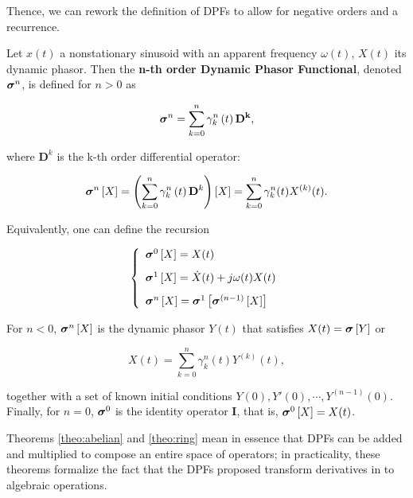 	Thence, we can rework the definition of DPFs to allow for negative orders and a recurrence.

\begin{definition}\label{def:steinmetzoperator_revisited} %
	Let $x(t)$ a nonstationary sinusoid with an apparent frequency $\omega(t)$, $X(t)$ its dynamic phasor. Then the \textbf{n-th order Dynamic Phasor Functional}, denoted $\boldsymbol{\sigma}^{n}$, is defined for $n>0$ as 

\begin{equation} \boldsymbol{\sigma}^{n} = \sum_{k=0}^n \gamma_k^n \left(t\right)\mathbf{D^k} , \end{equation}

	where $\mathbf{D}^k$ is the k-th order differential operator:

\begin{equation} \boldsymbol{\sigma}^{n} \left[X\right] = \left(\sum_{k=0}^n \gamma_k^n \left(t\right)\mathbf{D}^k\right) \left[X\right] = \sum_{k=0}^n \gamma_k^n (t) X^{(k)}(t). \end{equation}

	Equivalently, one can define the recursion

\begin{equation}\left\{\begin{array}{l} \ndpo{0}\left[X\right] = X(t) \\[3mm] \ndpo{1}\left[X\right] = \dot{X}(t) + j\omega(t)X(t) \\[3mm] \ndpo{n}\left[X\right] = \ndpo{1}\left[\raisebox{3mm}{} \ndpo{(n-1)}\left[X\right]\right] \end{array}\right. \end{equation}

	For $n < 0$, $\boldsymbol{\sigma}^{n} \left[X\right]$ is the dynamic phasor $Y(t)$ that satisfies $X(t) = \boldsymbol{\sigma}\left[Y\right]$ or

\begin{equation} X(t) = \sum_{k=0}^n \gamma_k^n (t) Y^{(k)}(t), \end{equation}

	\noindent together with a set of known initial conditions $Y(0),Y'(0),\cdots ,Y^{(n-1)}(0)$. Finally, for $n = 0$, $\boldsymbol{\sigma}^{0}$ is the identity operator $\mathbf{I}$, that is, $ \boldsymbol{\sigma}^{0} \left[X\right] = X(t)$.
\end{definition} %

	Theorems \ref{theo:abelian} and \ref{theo:ring} mean in essence that DPFs can be added and multiplied to compose an entire space of operators; in practicality, these theorems formalize the fact that the DPFs proposed transform derivatives in to algebraic operations.

